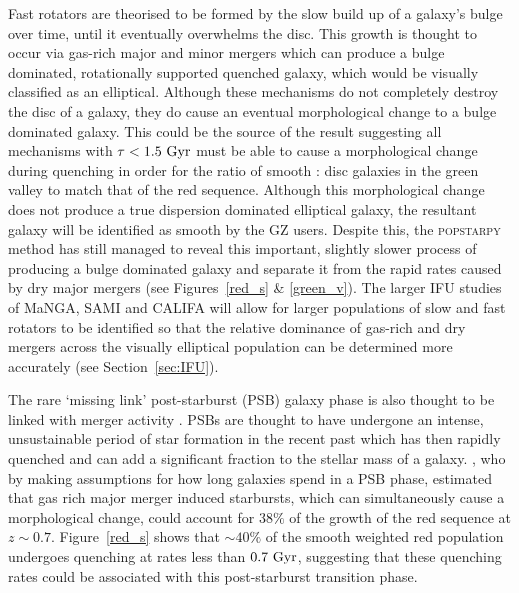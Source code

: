 Fast rotators are theorised to be formed by the slow build up of a galaxy's bulge over time, until it eventually overwhelms the disc. This growth is thought to occur via gas-rich major and minor mergers \citep{duc11} which can produce a bulge dominated, rotationally supported quenched galaxy, which would be visually classified as an elliptical. Although these mechanisms do not completely destroy the disc of a galaxy, they do cause an eventual morphological change to a bulge dominated galaxy. This could be the source of the result suggesting all mechanisms with $\tau < 1.5 ~\rm{Gyr}$ must be able to cause a morphological change during quenching in order for the ratio of smooth : disc galaxies in the green valley to match that of the red sequence. Although this morphological change does not produce a true dispersion dominated elliptical galaxy, the resultant galaxy will be identified as smooth by the GZ users. Despite this, the \textsc{popstarpy} method has still managed to reveal this important, slightly slower process of producing a bulge dominated galaxy and separate it from the rapid rates caused by dry major mergers (see Figures~\ref{red_s} \& \ref{green_v}). The larger IFU studies of MaNGA, SAMI and CALIFA will allow for larger populations of slow and fast rotators to be identified so that the relative dominance of gas-rich and dry mergers across the visually elliptical population can be determined more accurately (see Section~\ref{sec:IFU}). 

The rare \citep[$<1\%$;][]{Wong12, wild16} `missing link' post-starburst (PSB) galaxy phase is also thought to be linked with merger activity \citep{zabludoff96, blake04, goto05b, yang08, pawlik16}. PSBs are thought to have undergone an intense, unsustainable period of star formation in the recent past which has then rapidly quenched \citep{dressler83, abraham96b, poggianti99, goto03, goto05b, goto07} and can add a significant fraction \citep[$\sim10\%$;][]{wild10} to the stellar mass of a galaxy. \citet{Wild09}, who by making assumptions for how long galaxies spend in a PSB phase, estimated that gas rich major merger induced starbursts, which can simultaneously cause a morphological change, could account for $38\%$ of the growth of the red sequence at $z\sim0.7$. Figure~\ref{red_s} shows that $\sim40\%$ of the smooth weighted red population undergoes quenching at rates less than $0.7~\rm{Gyr}$, suggesting that these quenching rates could be associated with this post-starburst transition phase. 

